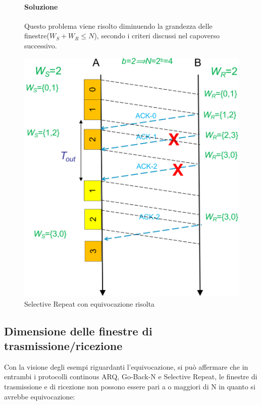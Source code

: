 \begin{figure}[htbp]
    \centering
    \begin{minipage}{0.48\textwidth}
        \paragraph{Soluzione}
        Questo problema viene risolto diminuendo la grandezza delle finestre($W_S + W_R \leq N$), secondo i criteri discussi nel capoverso successivo.
    \end{minipage}%
    \hfill
    \begin{minipage}{0.435\textwidth}
        \includegraphics[width=\linewidth]{images/equivocazionesr.png}
        \caption{Selective Repeat con equivocazione risolta}
    \end{minipage}
\end{figure}

\newpage

\subsection{Dimensione delle finestre di trasmissione/ricezione}
Con la visione degli esempi riguardanti l'equivocazione, si può affermare che in entrambi i protocolli continous ARQ, Go-Back-N e Selective Repeat, le finestre di trasmissione e di ricezione non possono essere pari a o maggiori di N in quanto si avrebbe equivocazione:


